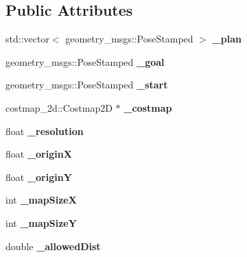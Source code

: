 \subsection*{Public Attributes}
\begin{DoxyCompactItemize}
\item 
std\+::vector$<$ geometry\+\_\+msgs\+::\+Pose\+Stamped $>$ {\bfseries \+\_\+plan}\hypertarget{classRRTPlannerHelper_ac29ee7b115e06233770f5ae0adaabfc4}{}\label{classRRTPlannerHelper_ac29ee7b115e06233770f5ae0adaabfc4}

\item 
geometry\+\_\+msgs\+::\+Pose\+Stamped {\bfseries \+\_\+goal}\hypertarget{classRRTPlannerHelper_a05a168ac5796fa9223fc65e9a34adefd}{}\label{classRRTPlannerHelper_a05a168ac5796fa9223fc65e9a34adefd}

\item 
geometry\+\_\+msgs\+::\+Pose\+Stamped {\bfseries \+\_\+start}\hypertarget{classRRTPlannerHelper_a9ce6ea01d2c7fc50eb1ac295bedcab08}{}\label{classRRTPlannerHelper_a9ce6ea01d2c7fc50eb1ac295bedcab08}

\item 
costmap\+\_\+2d\+::\+Costmap2D $\ast$ {\bfseries \+\_\+costmap}\hypertarget{classRRTPlannerHelper_a8022e8bc3b5d3358cbad20d804045f1f}{}\label{classRRTPlannerHelper_a8022e8bc3b5d3358cbad20d804045f1f}

\item 
float {\bfseries \+\_\+resolution}\hypertarget{classRRTPlannerHelper_a10ec2c02a83af5ee89298a799581e508}{}\label{classRRTPlannerHelper_a10ec2c02a83af5ee89298a799581e508}

\item 
float {\bfseries \+\_\+originX}\hypertarget{classRRTPlannerHelper_a5420ff18107881ea63e902a0d3a74aac}{}\label{classRRTPlannerHelper_a5420ff18107881ea63e902a0d3a74aac}

\item 
float {\bfseries \+\_\+originY}\hypertarget{classRRTPlannerHelper_a08961873e85b14e462ea84c2d39c20ff}{}\label{classRRTPlannerHelper_a08961873e85b14e462ea84c2d39c20ff}

\item 
int {\bfseries \+\_\+map\+SizeX}\hypertarget{classRRTPlannerHelper_a69639eb4295147df9995de9a0727ff27}{}\label{classRRTPlannerHelper_a69639eb4295147df9995de9a0727ff27}

\item 
int {\bfseries \+\_\+map\+SizeY}\hypertarget{classRRTPlannerHelper_a70a60acd18da760aae8f8181c133faa7}{}\label{classRRTPlannerHelper_a70a60acd18da760aae8f8181c133faa7}

\item 
double {\bfseries \+\_\+allowed\+Dist}\hypertarget{classRRTPlannerHelper_a4f305d9c128499eba054960e29f1989d}{}\label{classRRTPlannerHelper_a4f305d9c128499eba054960e29f1989d}

\end{DoxyCompactItemize}


